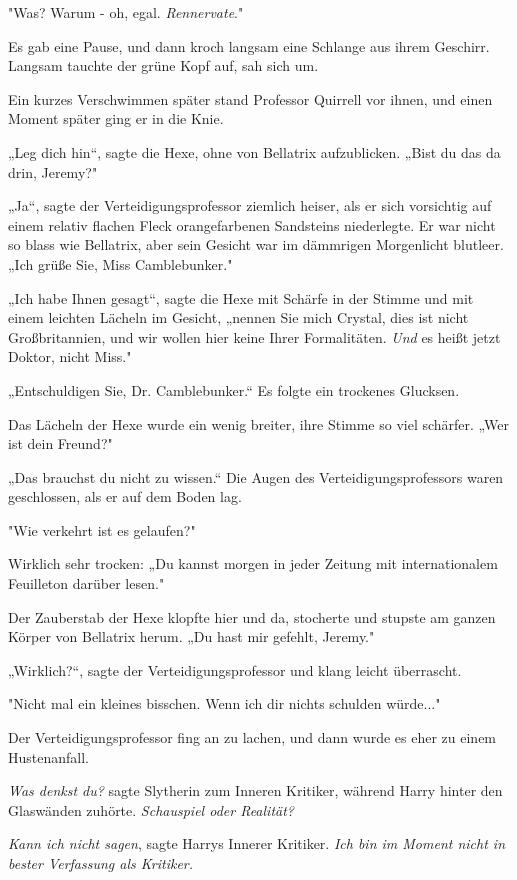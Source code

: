 {"Was? Warum - oh, egal. \emph{Rennervate}."

Es gab eine Pause, und dann kroch langsam eine Schlange aus ihrem Geschirr. Langsam tauchte der grüne Kopf auf, sah sich um.

Ein kurzes Verschwimmen später stand Professor Quirrell vor ihnen, und einen Moment später ging er in die Knie.

„Leg dich hin“, sagte die Hexe, ohne von Bellatrix aufzublicken. „Bist du das da drin, Jeremy?"

„Ja“, sagte der Verteidigungsprofessor ziemlich heiser, als er sich vorsichtig auf einem relativ flachen Fleck orangefarbenen Sandsteins niederlegte. Er war nicht so blass wie Bellatrix, aber sein Gesicht war im dämmrigen Morgenlicht blutleer. „Ich grüße Sie, Miss Camblebunker."

„Ich habe Ihnen gesagt“, sagte die Hexe mit Schärfe in der Stimme und mit einem leichten Lächeln im Gesicht, „nennen Sie mich Crystal, dies ist nicht Großbritannien, und wir wollen hier keine Ihrer Formalitäten. \emph{Und} es heißt jetzt Doktor, nicht Miss."

„Entschuldigen Sie, Dr. Camblebunker.“ Es folgte ein trockenes Glucksen.

Das Lächeln der Hexe wurde ein wenig breiter, ihre Stimme so viel schärfer. „Wer ist dein Freund?"

„Das brauchst du nicht zu wissen.“ Die Augen des Verteidigungsprofessors waren geschlossen, als er auf dem Boden lag.

"Wie verkehrt ist es gelaufen?"

Wirklich sehr trocken: „Du kannst morgen in jeder Zeitung mit internationalem Feuilleton darüber lesen."

Der Zauberstab der Hexe klopfte hier und da, stocherte und stupste am ganzen Körper von Bellatrix herum. „Du hast mir gefehlt, Jeremy."

„Wirklich?“, sagte der Verteidigungsprofessor und klang leicht überrascht.

"Nicht mal ein kleines bisschen. Wenn ich dir nichts schulden würde..."

Der Verteidigungsprofessor fing an zu lachen, und dann wurde es eher zu einem Hustenanfall.

\emph{Was denkst du?} sagte Slytherin zum Inneren Kritiker, während Harry hinter den Glaswänden zuhörte. \emph{Schauspiel oder Realität?}

\emph{Kann ich nicht sagen}, sagte Harrys Innerer Kritiker. \emph{Ich bin im Moment nicht in bester Verfassung als Kritiker.}

}

